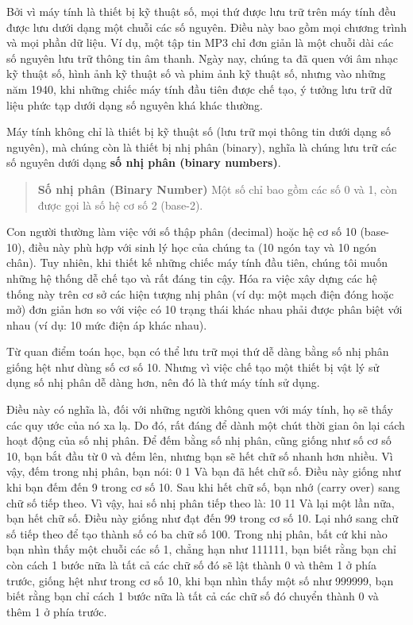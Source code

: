 Bởi vì máy tính là thiết bị kỹ thuật số, mọi thứ được lưu trữ trên máy
tính đều được lưu dưới dạng một chuỗi các số nguyên. Điều này bao gồm
mọi chương trình và mọi phần dữ liệu. Ví dụ, một tập tin MP3 chỉ đơn
giản là một chuỗi dài các số nguyên lưu trữ thông tin âm thanh. Ngày
nay, chúng ta đã quen với âm nhạc kỹ thuật số, hình ảnh kỹ thuật số và
phim ảnh kỹ thuật số, nhưng vào những năm 1940, khi những chiếc máy tính
đầu tiên được chế tạo, ý tưởng lưu trữ dữ liệu phức tạp dưới dạng số
nguyên khá khác thường.

Máy tính không chỉ là thiết bị kỹ thuật số (lưu trữ mọi thông tin dưới
dạng số nguyên), mà chúng còn là thiết bị nhị phân (binary), nghĩa là
chúng lưu trữ các số nguyên dưới dạng \textbf{số nhị phân (binary
numbers)}.

\begin{quote}
\textbf{Số nhị phân (Binary Number)} Một số chỉ bao gồm các số 0 và 1,
còn được gọi là số hệ cơ số 2 (base-2).
\end{quote}

Con người thường làm việc với số thập phân (decimal) hoặc hệ cơ số 10
(base-10), điều này phù hợp với sinh lý học của chúng ta (10 ngón tay và
10 ngón chân). Tuy nhiên, khi thiết kế những chiếc máy tính đầu tiên,
chúng tôi muốn những hệ thống dễ chế tạo và rất đáng tin cậy. Hóa ra
việc xây dựng các hệ thống này trên cơ sở các hiện tượng nhị phân (ví
dụ: một mạch điện đóng hoặc mở) đơn giản hơn so với việc có 10 trạng
thái khác nhau phải được phân biệt với nhau (ví dụ: 10 mức điện áp khác
nhau).

Từ quan điểm toán học, bạn có thể lưu trữ mọi thứ dễ dàng bằng số nhị
phân giống hệt như dùng số cơ số 10. Nhưng vì việc chế tạo một thiết bị
vật lý sử dụng số nhị phân dễ dàng hơn, nên đó là thứ máy tính sử dụng.

Điều này có nghĩa là, đối với những người không quen với máy tính, họ sẽ
thấy các quy ước của nó xa lạ. Do đó, rất đáng để dành một chút thời
gian ôn lại cách hoạt động của số nhị phân. Để đếm bằng số nhị phân,
cũng giống như số cơ số 10, bạn bắt đầu từ 0 và đếm lên, nhưng bạn sẽ
hết chữ số nhanh hơn nhiều. Vì vậy, đếm trong nhị phân, bạn nói: 0 1 Và
bạn đã hết chữ số. Điều này giống như khi bạn đếm đến 9 trong cơ số 10.
Sau khi hết chữ số, bạn nhớ (carry over) sang chữ số tiếp theo. Vì vậy,
hai số nhị phân tiếp theo là: 10 11 Và lại một lần nữa, bạn hết chữ số.
Điều này giống như đạt đến 99 trong cơ số 10. Lại nhớ sang chữ số tiếp
theo để tạo thành số có ba chữ số 100. Trong nhị phân, bất cứ khi nào
bạn nhìn thấy một chuỗi các số 1, chẳng hạn như 111111, bạn biết rằng
bạn chỉ còn cách 1 bước nữa là tất cả các chữ số đó sẽ lật thành 0 và
thêm 1 ở phía trước, giống hệt như trong cơ số 10, khi bạn nhìn thấy một
số như 999999, bạn biết rằng bạn chỉ cách 1 bước nữa là tất cả các chữ
số đó chuyển thành 0 và thêm 1 ở phía trước.

